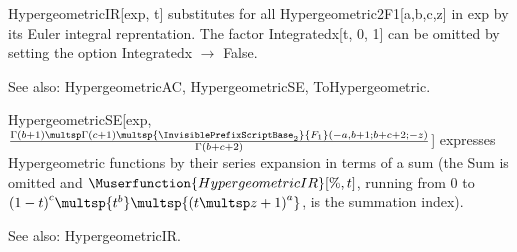 

HypergeometricIR[exp, t] substitutes for all Hypergeometric2F1[a,b,c,z] in exp by its Euler integral reprentation. The factor
  Integratedx[t, 0, 1] can be omitted by setting the option Integratedx \(\rightarrow \) False.

See also:  HypergeometricAC, HypergeometricSE, ToHypergeometric.












HypergeometricSE[exp, \(\frac{\Gamma (b+1)\multsp \Gamma (c+1)\multsp {{\InvisiblePrefixScriptBase }_2}{F_1}(-a,b+1;b+c+2;-z)}
   {\Gamma (b+c+2)}\)] expresses Hypergeometric functions by their series expansion in terms of a sum (the Sum is omitted and \(\Muserfunction{HypergeometricIR}[\%,t]\),
running from 0 to \({{(1-t)}^c}\multsp {t^b}\multsp {{(t\multsp z+1)}^a}\), is the summation index).

\dispSFinmath{
\nu
}

\dispSFoutmath{
\nu
}

See also:  HypergeometricIR.


